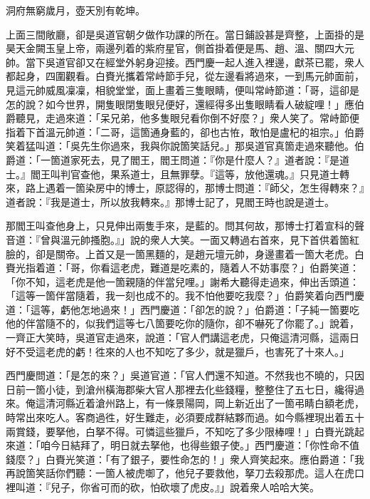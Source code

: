 洞府無窮歲月，壺天別有乾坤。

上面三間敞廳，卻是吳道官朝夕做作功課的所在。當日鋪設甚是齊整，上面掛的是昊天金闕玉皇上帝，兩邊列着的紫府星官，側首掛着便是馬、趙、溫、關四大元帥。{}當下吳道官卻又在經堂外躬身迎接。西門慶一起人進入裡邊，獻茶已罷，衆人都起身，四圍觀看。白賚光攜着常峙節手兒，從左邊看將過來，一到馬元帥面前，見這元帥威風凜凜，相貌堂堂，面上畫着三隻眼睛，便叫常峙節道：「哥，這卻是怎的說？如今世界，開隻眼閉隻眼兒便好，還經得多出隻眼睛看人破綻哩！」應伯爵聽見，走過來道：「呆兄弟，他多隻眼兒看你倒不好麼？」{}衆人笑了。常峙節便指着下首溫元帥道：「二哥，這箇通身藍的，卻也古恠，敢怕是盧杞的祖宗。」伯爵笑着猛叫道：「吳先生你過來，我與你說箇笑話兒。」那吳道官真箇走過來聽他。伯爵道：「一箇道家死去，見了閻王，閻王問道：『你是什麼人？』道者說：『是道士。』閻王叫判官查他，果系道士，且無罪孽。『這等，放他還魂。』只見道士轉來，路上遇着一箇染房中的博士，原認得的，那博士問道：『師父，怎生得轉來？』道者說：『我是道士，所以放我轉來。』那博士記了，見閻王時也說是道士。

那閻王叫查他身上，只見伸出兩隻手來，是藍的。問其何故，那博士打着宣科的聲音道：『曾與溫元帥搔胞。』」說的衆人大笑。一面又轉過右首來，見下首供着箇紅臉的，卻是關帝。上首又是一箇黑麵的，是趙元壇元帥，身邊畫着一箇大老虎。白賚光指着道：「哥，你看這老虎，難道是吃素的，隨着人不妨事麼？」伯爵笑道：「你不知，這老虎是他一箇親隨的伴當兒哩。」謝希大聽得走過來，伸出舌頭道：「這等一箇伴當隨着，我一刻也成不的。我不怕他要吃我麼？」伯爵笑着向西門慶道：「這等，虧他怎地過來！」西門慶道：「卻怎的說？」伯爵道：「子純一箇要吃他的伴當隨不的，似我們這等七八箇要吃你的隨你，卻不嚇死了你罷了。」{}說着，一齊正大笑時，吳道官走過來，說道：「官人們講這老虎，{}只俺這清河縣，這兩日好不受這老虎的虧！徃來的人也不知吃了多少，就是獵戶，也害死了十來人。」

西門慶問道：「是怎的來？」吳道官道：「官人們還不知道。不然我也不曉的，只因日前一箇小徒，到滄州橫海郡柴大官人那裡去化些錢糧，{}整整住了五七日，纔得過來。俺這清河縣近着滄州路上，有一條景陽岡，岡上新近出了一箇弔睛白額老虎，時常出來吃人。客商過徃，好生難走，必須要成群結夥而過。如今縣裡現出着五十兩賞錢，要拏他，白拏不得。可憐這些獵戶，不知吃了多少限棒哩！」白賚光跳起來道：「咱今日結拜了，明日就去拏他，也得些銀子使。」西門慶道：「你性命不值錢麼？」白賚光笑道：「有了銀子，要性命怎的！」衆人齊笑起來。應伯爵道：「我再說箇笑話你們聽：一箇人被虎啣了，他兒子要救他，拏刀去殺那虎。這人在虎口裡叫道：『兒子，你省可而的砍，怕砍壞了虎皮。』」{}說着衆人哈哈大笑。

